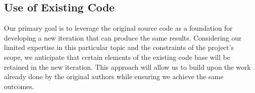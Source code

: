 \documentclass[letterpaper]{article} %
\begin{document}
\subsection{Use of Existing Code}

Our primary goal is to leverage the original source code as a foundation for developing a new iteration that can produce the same results. Considering our limited expertise in this particular topic and the constraints of the project's scope, we anticipate that certain elements of the existing code base will be retained in the new iteration. This approach will allow us to build upon the work already done by the original authors while ensuring we achieve the same outcomes.

% 
\end{document}
